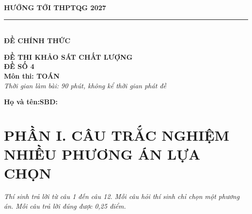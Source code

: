 \documentclass[12pt,a4paper]{article}
\begin{document}
\noindent
\begin{minipage}[t]{0.40\textwidth}
    \centering
    \textbf{HƯỚNG TỚI THPTQG 2027}\\[-2pt]
    \rule{3.2cm}{0.6pt}\\[4pt]
    \textbf{ĐỀ CHÍNH THỨC}
\end{minipage}\hfill
\begin{minipage}[t]{0.58\textwidth}
    \centering
    \textbf{ĐỀ THI KHẢO SÁT CHẤT LƯỢNG}\\
    \textbf{ĐỀ SỐ 4}\\
    \textbf{Môn thi: TOÁN}\\
    \textit{\small Thời gian làm bài: 90 phút, không kể thời gian phát đề}
\end{minipage}

\vspace{0.2cm}
\noindent
\begin{minipage}[b]{0.78\textwidth}
    \textbf{Họ và tên:}\dotfill\textbf{SBD:}\makebox[3.5cm]{\dotfill}
\end{minipage}\hfill
\begin{minipage}[b]{0.20\textwidth}
    \hfill
    \setlength{\fboxrule}{0.8pt}%
\end{minipage}
\vspace{0.2cm}

\section*{\large PHẦN I. CÂU TRẮC NGHIỆM NHIỀU PHƯƠNG ÁN LỰA CHỌN}
\textit{Thí sinh trả lời từ câu 1 đến câu 12. Mỗi câu hỏi thí sinh chỉ chọn một phương án. Mỗi câu trả lời đúng được 0,25 điểm.}
\end{document}
